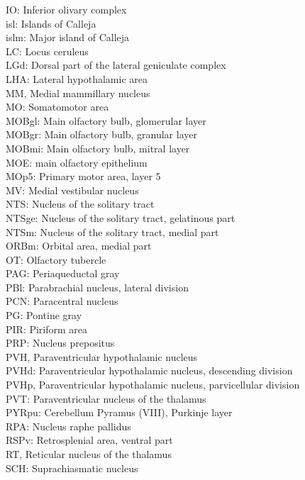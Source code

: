 IO: Inferior olivary complex\\ 
isl: Islands of Calleja \\
islm: Major island of Calleja\\ 
LC: Locus ceruleus \\
LGd: Dorsal part of the lateral geniculate complex\\ 
LHA: Lateral hypothalamic area \\
MM, Medial mammillary nucleus \\
MO: Somatomotor area\\
MOBgl: Main olfactory bulb, glomerular layer\\ 
MOBgr: Main olfactory bulb, granular layer \\
MOBmi: Main olfactory bulb, mitral layer \\
MOE: main olfactory epithelium \\
MOp5: Primary motor area, layer 5\\ 
MV: Medial vestibular nucleus \\
NTS: Nucleus of the solitary tract\\ 
NTSge: Nucleus of the solitary tract, gelatinous part\\ 
NTSm: Nucleus of the solitary tract, medial part \\
ORBm: Orbital area, medial part \\
OT: Olfactory tubercle \\
PAG: Periaqueductal gray \\
PBl: Parabrachial nucleus, lateral division\\ 
PCN: Paracentral nucleus \\
PG: Pontine gray \\
PIR: Piriform area \\
PRP: Nucleus prepositus \\
PVH, Paraventricular hypothalamic nucleus \\
PVHd: Paraventricular hypothalamic nucleus, descending division \\
PVHp, Paraventricular hypothalamic nucleus, parvicellular division\\ 
PVT: Paraventricular nucleus of the thalamus \\
PYRpu: Cerebellum Pyramus (VIII), Purkinje layer\\ 
RPA: Nucleus raphe pallidus \\
RSPv: Retrosplenial area, ventral part \\
RT, Reticular nucleus of the thalamus\\
SCH: Suprachiasmatic nucleus \\
